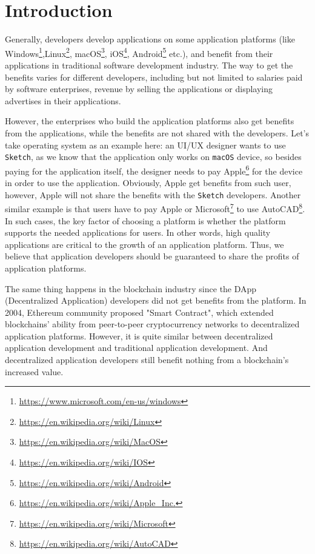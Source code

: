 \section{Introduction}

Generally, developers develop applications on some application platforms (like
Windows\footnote{\url{https://www.microsoft.com/en-us/windows}},Linux\footnote{\url{https://en.wikipedia.org/wiki/Linux}},
macOS\footnote{\url{https://en.wikipedia.org/wiki/MacOS}},
iOS\footnote{\url{https://en.wikipedia.org/wiki/IOS}},
Android\footnote{\url{https://en.wikipedia.org/wiki/Android}} etc.), and
benefit from their applications in traditional software development industry.
The way to get the benefits varies for different developers, including but not
limited to salaries paid by software enterprises, revenue by selling the
applications or displaying advertises in their applications.

However, the enterprises who build the application platforms also get benefits
from the applications, while the benefits are not shared with the developers. 
Let's take operating system as an example here: an UI/UX designer wants to use \texttt{Sketch}, 
as we know that the application only works on \texttt{macOS} device, so besides
paying for the application itself, the designer needs to pay Apple\footnote{\url{https://en.wikipedia.org/wiki/Apple_Inc.}} 
for the device in order to use the application. Obviously, Apple get benefits from such user, 
however, Apple will not share the benefits with the \texttt{Sketch} developers. 
Another similar example is that users have to pay Apple or
Microsoft\footnote{\url{https://en.wikipedia.org/wiki/Microsoft}} to use
AutoCAD\footnote{\url{https://en.wikipedia.org/wiki/AutoCAD}}. In such cases,
the key factor of choosing a platform is whether the platform
supports the needed applications for users. In other words, high quality
applications are critical to the growth of an application platform. Thus, we
believe that application developers should be guaranteed to share the profits
of application platforms.

The same thing happens in the blockchain industry since the 
DApp (Decentralized Application) developers did not get benefits from the
platform. In 2004, Ethereum community proposed "Smart Contract", 
which extended blockchains' ability from peer-to-peer
cryptocurrency networks to decentralized application platforms. However, it is
quite similar between decentralized application development and traditional
application development. And decentralized application developers still benefit
nothing from a blockchain's increased value.


